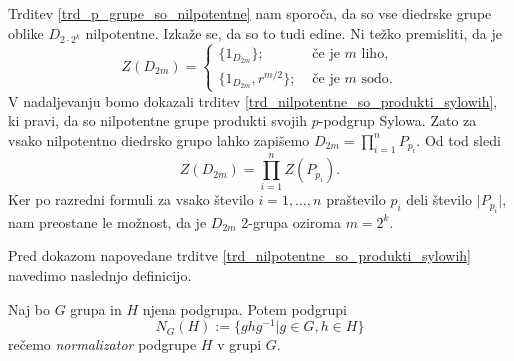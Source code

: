 \begin{primer}
    Trditev \ref{trd_p_grupe_so_nilpotentne} nam sporoča, da so vse diedrske grupe oblike $D_{2 \cdot 2^{k}}$ nilpotentne. Izkaže se, da so to tudi edine. Ni težko premisliti, da je \begin{equation*}
        Z(D_{2m}) = \begin{cases}
            \{ 1_{D_{2m}} \}  ; &\text{ če je $m$ liho}, \\
            \{ 1_{D_{2m}}, r^{m / 2} \} ;  &\text{ če je $m$ sodo}.
        \end{cases}
    \end{equation*}
    V nadaljevanju bomo dokazali trditev \ref{trd_nilpotentne_so_produkti_sylowih}, ki pravi, da so nilpotentne grupe produkti svojih $p$-podgrup Sylowa. Zato za vsako nilpotentno diedrsko grupo lahko zapišemo $D_{2 m} =  \prod_{i = 1}^{n}{P_{p_i}}$. Od tod sledi \begin{equation*}
        Z(D_{2m})  = \prod_{i = 1}^{n}{Z(P_{p_i})}.
    \end{equation*}
    Ker po razredni formuli za vsako število $i = 1, \ldots, n$ praštevilo $p_i$ deli število $\lvert P_{p_i} \rvert$, nam preostane le možnost, da je $D_{2 m}$ 2-grupa oziroma $m = 2^k$.
    \end{primer}

Pred dokazom napovedane trditve \ref{trd_nilpotentne_so_produkti_sylowih} navedimo naslednjo definicijo.

\begin{definicija}\label{def_normalizator}
    Naj bo $G$ grupa in $H$ njena podgrupa. Potem podgrupi \begin{equation*}
        N_G(H) := \{ g h g^{-1}  \vert  g \in G, h \in H \}
    \end{equation*}
    rečemo \emph{normalizator} podgrupe $H$ v grupi $G$. %
\end{definicija}

